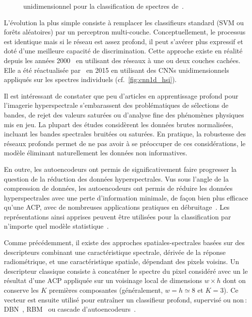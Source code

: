 \begin{figure}[h]
  \resizebox{\textwidth}{!}{}
  \caption[ unidimensionnel pour la classification de spectres.]{ unidimensionnel pour la classification de spectres de~\citet{hu_deep_2015}.}
\end{figure}

L'évolution la plus simple consiste à remplacer les classifieurs standard (\gls{SVM} ou forêts aléatoires) par un perceptron multi-couche. Conceptuellement, le processus est identique mais si le réseau est assez profond, il peut s'avérer plus expressif et doté d'une meilleure capacité de discrimination. Cette approche existe en réalité depuis les années 2000~\cite{goel_classification_2003,ratle_semisupervised_2010} en utilisant des réseaux à une ou deux couches cachées. Elle a été réactualisée par~\citet{hu_deep_2015} en 2015 en utilisant des \glspl{CNN} unidimensionnels appliqués sur les spectres individuels (cf.~\cref{fig:cnn1d_hsi}).

Il est intéressant de constater que peu d'articles en apprentissage profond pour l'imagerie hyperspectrale s'embarassent des problématiques de sélections de bandes, de rejet des valeurs saturées ou d'analyse fine des phénomènes physiques mis en jeu. La plupart des études considèrent les données brutes normalisées, incluant les bandes spectrales bruitées ou saturées. En pratique, la robustesse des réseaux profonds permet de ne pas avoir à se préoccuper de ces considérations, le modèle éliminant naturellement les données non informatives.

En outre, les autoencodeurs ont permis de significativement faire progresser la question de la réduction des données hyperspectrales. Vus sous l'angle de la compression de données, les autoencodeurs ont permis de réduire les données hyperspectrales avec une perte d'information minimale, de façon bien plus efficace qu'une \gls{ACP}, avec de nombreuses applications pratiques en débruitage~\cite{xing_stacked_2015}. Les représentations ainsi apprises peuvent être utilisées pour la classification par n'importe quel modèle statistique~\cite{fu_semi-supervised_2016}.

Comme précédemment, il existe des approches spatiales-spectrales basées sur des descripteurs combinant une caractéristique spectrale, dérivée de la réponse radiométrique, et une caractéristique spatiale, dépendant des pixels voisins. Un descripteur classique consiste à concaténer le spectre du pixel considéré avec un le résultat d'une \gls{ACP} appliquée sur un voisinage local de dimensions $w\times h$ dont on conserve les $K$ premières composantes (généralement, $w = h \simeq 8$ et $K = 3$). Ce vecteur est ensuite utilisé pour entraîner un classifieur profond, supervisé ou non\,: \gls{DBN}~\cite{li_classification_2014,chen_spectral-spatial_2015}, \gls{RBM}~\cite{lin_spectral-spatial_2013,midhun_deep_2014} ou cascade d'autoencodeurs~\cite{chen_deep_2014,ma_spectral-spatial_2016,tao_unsupervised_2015,wang_spectralspatial_2017}.

